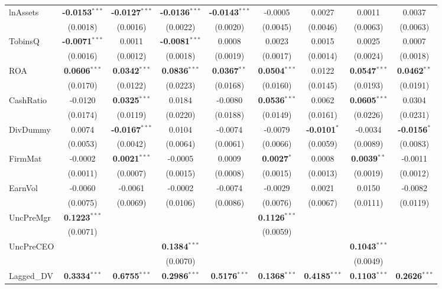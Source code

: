 \documentclass[11pt,a4paper]{article}
\begin{document}
\begin{table}[htbp]
\begin{tabular}{lcccccccc}
lnAssets & \textbf{-0.0153}$^{***}$ & \textbf{-0.0127}$^{***}$ & \textbf{-0.0136}$^{***}$ & \textbf{-0.0143}$^{***}$ & -0.0005 & 0.0027 & 0.0011 & 0.0037 \\
 & (0.0018) & (0.0016) & (0.0022) & (0.0020) & (0.0045) & (0.0046) & (0.0063) & (0.0063) \\
TobinsQ & \textbf{-0.0071}$^{***}$ & 0.0011 & \textbf{-0.0081}$^{***}$ & 0.0008 & 0.0023 & 0.0015 & 0.0025 & 0.0007 \\
 & (0.0016) & (0.0012) & (0.0018) & (0.0019) & (0.0017) & (0.0014) & (0.0024) & (0.0018) \\
ROA & \textbf{0.0606}$^{***}$ & \textbf{0.0342}$^{***}$ & \textbf{0.0836}$^{***}$ & \textbf{0.0367}$^{**}$ & \textbf{0.0504}$^{***}$ & 0.0122 & \textbf{0.0547}$^{***}$ & \textbf{0.0462}$^{**}$ \\
 & (0.0170) & (0.0122) & (0.0223) & (0.0168) & (0.0160) & (0.0145) & (0.0193) & (0.0191) \\
CashRatio & -0.0120 & \textbf{0.0325}$^{***}$ & 0.0184 & -0.0080 & \textbf{0.0536}$^{***}$ & 0.0062 & \textbf{0.0605}$^{***}$ & 0.0304 \\
 & (0.0174) & (0.0119) & (0.0220) & (0.0188) & (0.0149) & (0.0161) & (0.0226) & (0.0231) \\
DivDummy & 0.0074 & \textbf{-0.0167}$^{***}$ & 0.0104 & -0.0074 & -0.0079 & \textbf{-0.0101}$^{*}$ & -0.0034 & \textbf{-0.0156}$^{*}$ \\
 & (0.0053) & (0.0042) & (0.0064) & (0.0061) & (0.0066) & (0.0059) & (0.0089) & (0.0083) \\
FirmMat & -0.0002 & \textbf{0.0021}$^{***}$ & -0.0005 & 0.0009 & \textbf{0.0027}$^{*}$ & 0.0008 & \textbf{0.0039}$^{**}$ & -0.0011 \\
 & (0.0011) & (0.0007) & (0.0015) & (0.0008) & (0.0015) & (0.0013) & (0.0019) & (0.0012) \\
EarnVol & -0.0060 & -0.0061 & -0.0002 & -0.0074 & -0.0029 & 0.0021 & 0.0150 & -0.0082 \\
 & (0.0075) & (0.0069) & (0.0106) & (0.0086) & (0.0076) & (0.0067) & (0.0111) & (0.0119) \\
UncPreMgr & \textbf{0.1223}$^{***}$ &  &  &  & \textbf{0.1126}$^{***}$ &  &  &  \\
 & (0.0071) &  &  &  & (0.0059) &  &  &  \\
UncPreCEO &  &  & \textbf{0.1384}$^{***}$ &  &  &  & \textbf{0.1043}$^{***}$ &  \\
 &  &  & (0.0070) &  &  &  & (0.0049) &  \\
Lagged\_DV & \textbf{0.3334}$^{***}$ & \textbf{0.6755}$^{***}$ & \textbf{0.2986}$^{***}$ & \textbf{0.5176}$^{***}$ & \textbf{0.1368}$^{***}$ & \textbf{0.4185}$^{***}$ & \textbf{0.1103}$^{***}$ & \textbf{0.2626}$^{***}$ \\

\end{tabular}
\end{table}
\end{document}
